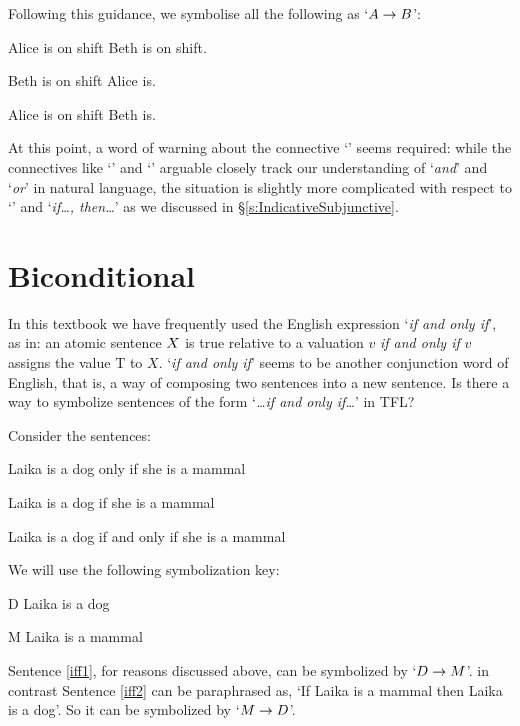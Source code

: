 	
	\noindent Following this guidance, we symbolise all the following as `$A\rightarrow B$':
	\begin{earg}
		\item[\ex{ifthen1}]  Alice is on shift  Beth is on shift.
		\item[\ex{ifthen2}]  Beth is on shift  Alice is.
		\item[\ex{ifthen3}]  Alice is on shift  Beth is.
	\end{earg}

 At this point, a word of warning about the connective `\eif'  seems required: while the connectives like `\eand' and `\eor' arguable closely track our understanding of `\emph{and}' and `\emph{or}' in natural language, the situation is slightly more complicated with respect to `\eif' and `\emph{if\ldots, then\ldots}' as we discussed in \S\ref{s:IndicativeSubjunctive}.

\section{Biconditional}
In this textbook we have frequently used the English expression `\emph{if and only if}', as in: an atomic sentence $X$ is true relative to a valuation $v$ \emph{if and only if} $v$ assigns the value T to $X$. `\emph{if and only if}' seems to be another conjunction word of English, that is, a way of composing two sentences into a new sentence. Is there a way to symbolize sentences of the form `\emph{\ldots if and only if\ldots}' in TFL?

Consider the sentences:
	\begin{earg}
		\item[\ex{iff1}] Laika is a dog only if she is a mammal
		\item[\ex{iff2}] Laika is a dog if she is a mammal
		\item[\ex{iff3}] Laika is a dog if and only if she is a mammal
	\end{earg}
We will use the following symbolization key:
	\begin{ekey}
		\item[D] Laika is a dog
		\item[M] Laika is a mammal
	\end{ekey}
Sentence \ref{iff1}, for reasons discussed above, can be symbolized by `$D \rightarrow M$'. in contrast Sentence \ref{iff2} can be paraphrased as, `If Laika is a mammal then Laika is a dog'. So it can be symbolized by `$M \rightarrow D$'.

